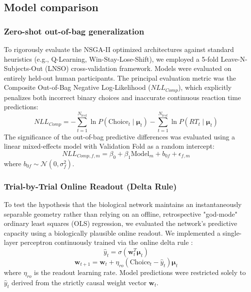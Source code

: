 \documentclass[12pt, a4paper]{extarticle}
\begin{document}
	\subsection{Model comparison}
	
	\subsubsection{Zero-shot out-of-bag generalization}
	To rigorously evaluate the NSGA-II optimized architectures against standard heuristics (e.g., Q-Learning, Win-Stay-Lose-Shift), we employed a 5-fold Leave-N-Subjects-Out (LNSO) cross-validation framework. Models were evaluated on entirely held-out human participants. The principal evaluation metric was the Composite Out-of-Bag Negative Log-Likelihood ($NLL_{Comp}$), which explicitly penalizes both incorrect binary choices and inaccurate continuous reaction time predictions:
	\begin{equation}
		NLL_{Comp} = -\sum_{t=1}^{N_{test}} \ln P(\text{Choice}_t \mid \boldsymbol{\mu}_t) - \sum_{t=1}^{N_{test}} \ln P(RT_t \mid \boldsymbol{\mu}_t)
	\end{equation}
	The significance of the out-of-bag predictive differences was evaluated using a linear mixed-effects model with Validation Fold as a random intercept:
	\begin{equation}
		NLL_{Comp, f, m} = \beta_0 + \beta_1 \mathrm{Model}_{m} + b_{0f} + \epsilon_{f,m}
	\end{equation}
	where $b_{0f} \sim \mathcal{N}(0, \sigma_f^2)$.
	
	\subsubsection{Trial-by-Trial Online Readout (Delta Rule)}
	To test the hypothesis that the biological network maintains an instantaneously separable geometry rather than relying on an offline, retrospective "god-mode" ordinary least squares (OLS) regression, we evaluated the network's predictive capacity using a biologically plausible online readout. We implemented a single-layer perceptron continuously trained via the online delta rule \parencite{widrow1960adaptive}:
	\begin{equation}
		\hat{y}_t = \sigma(\mathbf{w}_t^T \boldsymbol{\mu}_t)
	\end{equation}
	\begin{equation}
		\mathbf{w}_{t+1} = \mathbf{w}_t + \eta_{ro} (\text{Choice}_t - \hat{y}_t) \boldsymbol{\mu}_t
	\end{equation}
	where $\eta_{ro}$ is the readout learning rate. Model predictions were restricted solely to $\hat{y}_t$ derived from the strictly causal weight vector $\mathbf{w}_t$.
	
\end{document}
